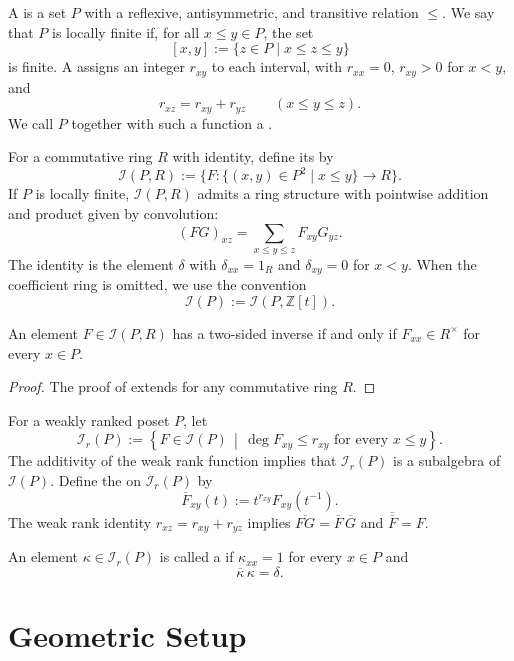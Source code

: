\documentclass[a4paper]{article}
\newcommand\II{{\mathcal{I}}}
\begin{document}
A  is a set $P$ with a reflexive, antisymmetric, and transitive relation $\leq$. We say that $P$ is locally finite if, for all $x\leq y\in P$,  the set
\[
        [x,y]:=\{z\in P\mid x\leq z\leq y\}
\]
is finite. 
A  assigns an integer $r_{xy}$ to each interval, with $r_{xx}=0$, $r_{xy}>0$ for $x<y$, and
\[
        r_{xz}=r_{xy}+r_{yz}\qquad(x\leq y\leq z).
\]
We call $P$ together with such a function a .

For a commutative ring $R$ with identity, define its  by
\[
        \II(P,R):=\{F:\{(x,y)\in P^2\mid x\leq y\}\longrightarrow R\}.
\]
If $P$ is locally finite, $\II(P,R)$ admits a ring structure with pointwise addition and product given by convolution:
\[
        (FG)_{xz}=\sum_{x\leq y\leq z}F_{xy}G_{yz}.
\]
The identity is the element $\delta$ with $\delta_{xx}=1_R$ and $\delta_{xy}=0$ for $x<y$. When the coefficient ring is omitted, we use the convention
\[
        \II(P):=\II(P,\mathbb{Z}[t]).
\]

\begin{lemma}{}
        An element $F\in\II(P,R)$ has a two-sided inverse if and only if $F_{xx}\in R^\times$ for every $x\in P$. 
        \begin{proof}
                The proof of \cite[Lemma~2.1]{Proudfoot2018} extends for any commutative ring $R$.
        \end{proof}
\end{lemma}

For a weakly ranked poset $P$, let
\[
        \II_r(P) :=
        \left\{ F\in\II(P) \,\middle|\, \deg F_{xy}\leq r_{xy} \text{ for every }x\leq y \right\}.
\]
The additivity of the weak rank function implies that $\II_r(P)$ is a subalgebra of $\II(P)$. 
Define the  on $\II_r(P)$ by
\[
        \overline{F}_{xy}(t)
        :=
        t^{r_{xy}}F_{xy}(t^{-1}).
\]
The weak rank identity $r_{xz}=r_{xy}+r_{yz}$ implies $\overline{FG}=\overline F\,\overline G$ and $\overline{\overline F}=F$.

\begin{definition}{}
        An element $\kappa\in\II_r(P)$ is called a  if $\kappa_{xx}=1$ for every $x\in P$ and 
        \[
                \overline{\kappa}\,\kappa=\delta.
        \]
\end{definition}

\section{Geometric Setup}
\end{document}
